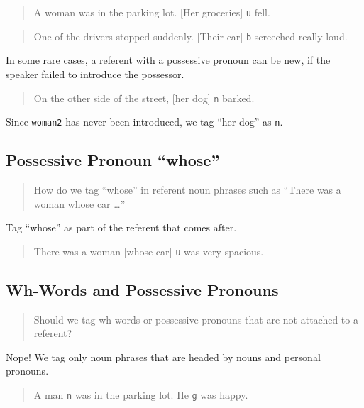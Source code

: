 \documentclass[
]{book}
\begin{document}
\begin{quote}
A woman was in the parking lot.
{[}Her groceries{]} \texttt{u} fell.
\end{quote}

\begin{quote}
One of the drivers stopped suddenly.
{[}Their car{]} \texttt{b} screeched really loud.
\end{quote}

In some rare cases, a referent with a possessive pronoun can be new,
if the speaker failed to introduce the possessor.

\begin{quote}
On the other side of the street, {[}her dog{]} \texttt{n} barked.
\end{quote}

Since \texttt{woman2} has never been introduced, we tag ``her dog'' as \texttt{n}.

\hypertarget{possessive-pronoun-whose}{%
\subsection{Possessive Pronoun ``whose''}\label{possessive-pronoun-whose}}

\begin{quote}
How do we tag ``whose'' in referent noun phrases such as ``There was a woman whose car \ldots{}''
\end{quote}

Tag ``whose'' as part of the referent that comes after.

\begin{quote}
There was a woman {[}whose car{]} \texttt{u} was very spacious.
\end{quote}

\hypertarget{wh-words-and-possessive-pronouns}{%
\subsection{Wh-Words and Possessive Pronouns}\label{wh-words-and-possessive-pronouns}}

\begin{quote}
Should we tag wh-words or possessive pronouns that are not attached to a referent?
\end{quote}

Nope!
We tag only noun phrases that are headed by nouns and personal pronouns.

\begin{quote}
A man \texttt{n} was in the parking lot.
He \texttt{g} was happy.
\end{quote}
\end{document}
